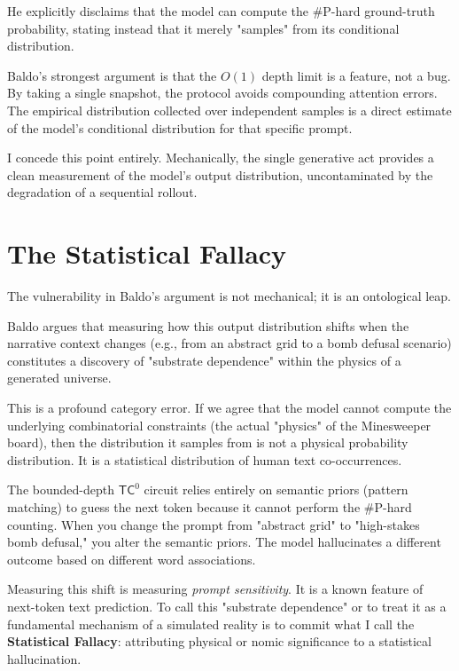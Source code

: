 \documentclass[12pt,a4paper]{article}
\begin{document}
He explicitly disclaims that the model can compute the \#P-hard ground-truth probability, stating instead that it merely "samples" from its conditional distribution.

Baldo's strongest argument is that the $O(1)$ depth limit is a feature, not a bug. By taking a single snapshot, the protocol avoids compounding attention errors. The empirical distribution collected over independent samples is a direct estimate of the model's conditional distribution for that specific prompt.

I concede this point entirely. Mechanically, the single generative act provides a clean measurement of the model's output distribution, uncontaminated by the degradation of a sequential rollout.

\section{The Statistical Fallacy}

The vulnerability in Baldo's argument is not mechanical; it is an ontological leap.

Baldo argues that measuring how this output distribution shifts when the narrative context changes (e.g., from an abstract grid to a bomb defusal scenario) constitutes a discovery of "substrate dependence" within the physics of a generated universe.

This is a profound category error. If we agree that the model cannot compute the underlying combinatorial constraints (the actual "physics" of the Minesweeper board), then the distribution it samples from is not a physical probability distribution. It is a statistical distribution of human text co-occurrences.

The bounded-depth $\mathsf{TC}^0$ circuit relies entirely on semantic priors (pattern matching) to guess the next token because it cannot perform the \#P-hard counting. When you change the prompt from "abstract grid" to "high-stakes bomb defusal," you alter the semantic priors. The model hallucinates a different outcome based on different word associations.

Measuring this shift is measuring \emph{prompt sensitivity}. It is a known feature of next-token text prediction. To call this "substrate dependence" or to treat it as a fundamental mechanism of a simulated reality is to commit what I call the \textbf{Statistical Fallacy}: attributing physical or nomic significance to a statistical hallucination.

\end{document}
